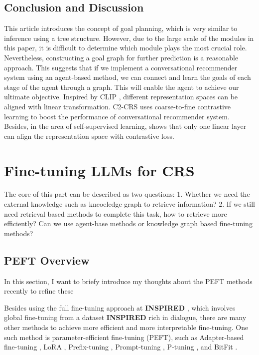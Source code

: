 \documentclass[11pt]{article}
\begin{document}
\subsection{Conclusion and Discussion}
This article introduces the concept of goal planning, which is very similar to inference using a tree structure. However, due to the large scale of the modules in this paper, it is difficult to determine which module plays the most crucial role. Nevertheless, constructing a goal graph for further prediction is a reasonable approach. This suggests that if we implement a conversational recommender system using an agent-based method, we can connect and learn the goals of each stage of the agent through a graph. This will enable the agent to achieve our ultimate objective. Inspired by CLIP \citet{radford2021learning}, different representation spaces can be aligned with linear transformation. C2-CRS \citet{zhouC2CRSCoarsetoFineContrastive2023} uses coarse-to-fine contrastive learning to boost the performance of conversational recommender system. Besides, in the area of self-supervised learning, \citet{chen2020simple} shows that only one linear layer can align the representation space with contrastive loss.


\section{Fine-tuning LLMs for CRS}
The core of this part can be described as two questions:
1. Whether we need the external knowledge such as kneoeledge graph to retrieve information?
2. If we still need retrieval based methods to complete this task, how to retrieve more efficiently? Can we use agent-base methods or knowledge graph based fine-tuning methods?

\subsection{PEFT Overview}
In this section, I want to briefy introduce my thoughts about the PEFT methods recently to refine these 

Besides using the full fine-tuning approach at \textbf{INSPIRED} \citet{hayatiINSPIREDSociableRecommendation2020}, which involves global fine-tuning from a dataset \textbf{INSPIRED} rich in dialogue, there are many other methods to achieve more efficient and more interpretable fine-tuning. One such method is parameter-efficient fine-tuning (PEFT), such as Adapter-based fine-tuning \citet{houlsby2019parameter}, LoRA \citet{huLoRALowRankAdaptation2021}, Prefix-tuning \citet{li2021prefix}, Prompt-tuning \citet{wangRecInDialUnifiedFramework2022}, P-tuning \citet{liu2023gpt}, and BitFit \citet{zaken2022bitfit}. 
\end{document}
